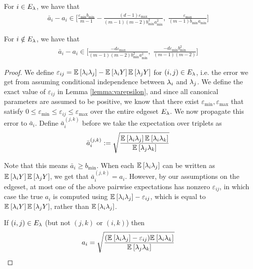 \begin{lemma}
For $i \in E_{\lambda}$, we have that
\begin{align}
    \bar{a}_i - a_i \in \bigg[\frac{\varepsilon_{\min} b_{\min}}{m - 1} - \frac{(d - 1)\varepsilon_{\max}}{(m - 1)(m - 2) b_{\min}^2 a_{\min}^2}, \; \frac{\varepsilon_{\max}}{(m - 1) b_{\min}a_{\min}} \bigg]
\end{align}

For $i \notin E_{\lambda}$, we have that
\begin{align}
    \bar{a}_i - a_i \in \bigg[\frac{-d \varepsilon_{\max}}{(m - 1)(m - 2) b_{\min}^2 a_{\min}^2}, \; \frac{-d \varepsilon_{\min} b_{\min}^2}{(m - 1)(m - 2)} \bigg]
\end{align}
\end{lemma}

\begin{proof}
We define $\varepsilon_{ij} = \mathbb{E}_{}\left[\lambda_i \lambda_j\right] - \mathbb{E}_{}\left[\lambda_i Y\right] \mathbb{E}_{}\left[\lambda_j Y\right]$ for $(i, j) \in E_{\lambda}$, i.e. the error we get from assuming conditional independence between $\lambda_i$ and $\lambda_j$. We define the exact value of $\varepsilon_{ij}$ in Lemma \ref{lemma:varepsilon}, and since all canonical parameters are assumed to be positive, we know that there exist $\varepsilon_{\min}, \varepsilon_{\max}$ that satisfy $0 \le \varepsilon_{\min} \le \varepsilon_{ij} \le \varepsilon_{\max}$ over the entire edgeset $E_{\lambda}$. We now propagate this error to $\bar{a}_i$. Define $\bar{a}_i^{(j, k)}$ before we take the expectation over triplets as
\begin{align*}
\bar{a}_i^{(j, k)} := \sqrt{\frac{\mathbb{E}_{}\left[\lambda_i \lambda_j\right] \mathbb{E}_{}\left[\lambda_i \lambda_k\right]}{\mathbb{E}_{}\left[\lambda_j \lambda_k\right]}} 
\end{align*}

Note that this means $\bar{a}_i \ge b_{\min}$. When each $\mathbb{E}_{}\left[\lambda_i \lambda_j\right]$ can be written as $\mathbb{E}_{}\left[\lambda_i Y\right] \mathbb{E}_{}\left[\lambda_j Y\right]$, we get that $\bar{a}_i^{(j, k)} = a_i$. However, by our assumptions on the edgeset, at most one of the above pairwise expectations has nonzero $\varepsilon_{ij}$, in which case the true $a_i$ is computed using $\mathbb{E}_{}\left[\lambda_i \lambda_j\right] - \varepsilon_{ij}$, which is equal to $\mathbb{E}_{}\left[\lambda_i Y\right] \mathbb{E}_{}\left[\lambda_j Y\right]$, rather than $\mathbb{E}_{}\left[\lambda_i \lambda_j\right]$.

If $(i, j) \in E_{\lambda}$ (but not $(j, k)$ or $(i, k)$) then
\begin{align*}
a_i = \sqrt{\frac{(\mathbb{E}_{}\left[\lambda_i \lambda_j\right] - \varepsilon_{ij}) \mathbb{E}_{}\left[\lambda_i \lambda_k\right]}{\mathbb{E}_{}\left[\lambda_j \lambda_k\right]}}
\end{align*}


\end{proof}
